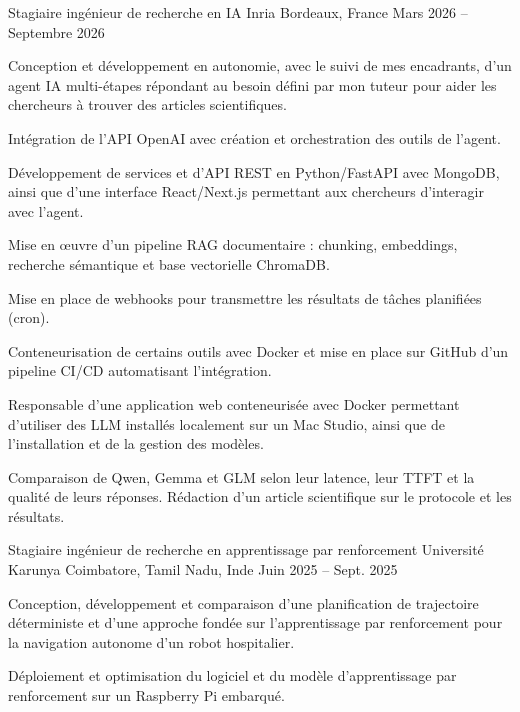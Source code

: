 
\begin{cventries}
  \cventry
    {Stagiaire ingénieur de recherche en IA}
    {Inria}
    {Bordeaux, France}
    {Mars 2026 -- Septembre 2026}
    {
      \begin{cvitems}
        \item {Conception et développement en autonomie, avec le suivi de mes encadrants, d’un agent IA multi-étapes répondant au besoin défini par mon tuteur pour aider les chercheurs à trouver des articles scientifiques.}
        \item {Intégration de l’API OpenAI avec création et orchestration des outils de l’agent.}
        \item {Développement de services et d’API REST en Python/FastAPI avec MongoDB, ainsi que d’une interface React/Next.js permettant aux chercheurs d’interagir avec l’agent.}
        \item {Mise en œuvre d’un pipeline RAG documentaire : chunking, embeddings, recherche sémantique et base vectorielle ChromaDB.}
        \item {Mise en place de webhooks pour transmettre les résultats de tâches planifiées (cron).}
        \item {Conteneurisation de certains outils avec Docker et mise en place sur GitHub d’un pipeline CI/CD automatisant l’intégration.}
        \item {Responsable d’une application web conteneurisée avec Docker permettant d’utiliser des LLM installés localement sur un Mac Studio, ainsi que de l’installation et de la gestion des modèles.}
        \item {Comparaison de Qwen, Gemma et GLM selon leur latence, leur TTFT et la qualité de leurs réponses. Rédaction d’un article scientifique sur le protocole et les résultats.}
      \end{cvitems}
    }

  \cventry
    {Stagiaire ingénieur de recherche en apprentissage par renforcement}
    {Université Karunya}
    {Coimbatore, Tamil Nadu, Inde}
    {Juin 2025 -- Sept. 2025}
    {
      \begin{cvitems}
        \item {Conception, développement et comparaison d’une planification de trajectoire déterministe et d’une approche fondée sur l’apprentissage par renforcement pour la navigation autonome d’un robot hospitalier.}
        \item {Déploiement et optimisation du logiciel et du modèle d’apprentissage par renforcement sur un Raspberry Pi embarqué.}
      \end{cvitems}
    }
\end{cventries}
